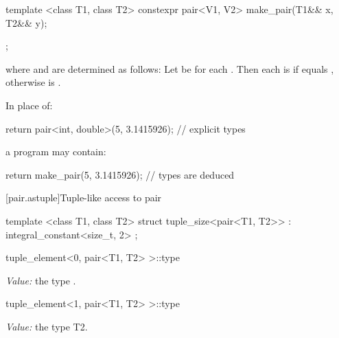 \begin{itemdescr}
\pnum
\effects {}
\end{itemdescr}

%
\begin{itemdecl}
template <class T1, class T2>
  constexpr pair<V1, V2> make_pair(T1&& x, T2&& y);
\end{itemdecl}

\begin{itemdescr}
\pnum
\returns {};

where  and  are determined as follows: Let  be
 for each . Then each  is 
if  equals , otherwise  is
.

\pnum
\enterexample
In place of:

\begin{codeblock}
  return pair<int, double>(5, 3.1415926);   // explicit types
\end{codeblock}

a \Cpp program may contain:

\begin{codeblock}
  return make_pair(5, 3.1415926);           // types are deduced
\end{codeblock}
\exitexample
\end{itemdescr}

[pair.astuple]{Tuple-like access to pair}

%
\begin{itemdecl}
template <class T1, class T2>
struct tuple_size<pair<T1, T2>>
  : integral_constant<size_t, 2> { };
\end{itemdecl}

%
\begin{itemdecl}
tuple_element<0, pair<T1, T2> >::type
\end{itemdecl}
\begin{itemdescr}
\pnum\textit{Value:} the type .
\end{itemdescr}

%
\begin{itemdecl}
tuple_element<1, pair<T1, T2> >::type
\end{itemdecl}
\begin{itemdescr}
\pnum\textit{Value:} the type T2.
\end{itemdescr}

